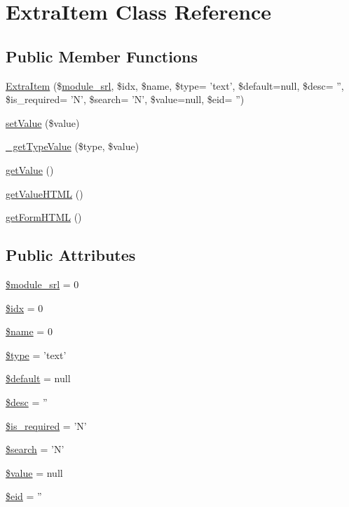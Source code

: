 \hypertarget{classExtraItem}{\section{Extra\-Item Class Reference}
\label{classExtraItem}
}
\subsection*{Public Member Functions}
\begin{DoxyCompactItemize}
\item 
\hyperlink{classExtraItem_abdf34ec801688507ddbc1acd513d2f8d}{Extra\-Item} (\$\hyperlink{ko_8install_8php_a370bb6450fab1da3e0ed9f484a38b761}{module\-\_\-srl}, \$idx, \$name, \$type= 'text', \$default=null, \$desc= '', \$is\-\_\-required= 'N', \$search= 'N', \$value=null, \$eid= '')
\item 
\hyperlink{classExtraItem_a6bec289dc0622bd882a36cb9b5680b03}{set\-Value} (\$value)
\item 
\hyperlink{classExtraItem_ac285a098cdd05b2c152b3d94c8cb95db}{\-\_\-get\-Type\-Value} (\$type, \$value)
\item 
\hyperlink{classExtraItem_a61ff542aa57144ac9e8d20d40f426486}{get\-Value} ()
\item 
\hyperlink{classExtraItem_a7784f081919e81e4a41ab0c250d6ca52}{get\-Value\-H\-T\-M\-L} ()
\item 
\hyperlink{classExtraItem_aaedac8843abdf391e8f4d22704606898}{get\-Form\-H\-T\-M\-L} ()
\end{DoxyCompactItemize}
\subsection*{Public Attributes}
\begin{DoxyCompactItemize}
\item 
\hyperlink{classExtraItem_a21cce86c0846b13228273314216e5ab9}{\$module\-\_\-srl} = 0
\item 
\hyperlink{classExtraItem_aadcda4aa903481b261d86bc50ab1c238}{\$idx} = 0
\item 
\hyperlink{classExtraItem_a32694a2408e9e2cca1d680356cf937d3}{\$name} = 0
\item 
\hyperlink{classExtraItem_ac965cc202d067c0449be9976045fd4be}{\$type} = 'text'
\item 
\hyperlink{classExtraItem_a8499b54a8ec7aa3e3a40201d1458ffe5}{\$default} = null
\item 
\hyperlink{classExtraItem_a47059cf3ac48f0d31c5358fa5e97f106}{\$desc} = ''
\item 
\hyperlink{classExtraItem_a616da9975ea87e9b61b6b9a2daf5e769}{\$is\-\_\-required} = 'N'
\item 
\hyperlink{classExtraItem_a086e30bc8e2d078ad1108d00ae58a60c}{\$search} = 'N'
\item 
\hyperlink{classExtraItem_a46622b49026acdfce833d5118a43986d}{\$value} = null
\item 
\hyperlink{classExtraItem_a8a68f26bb602679ebf4095e774425092}{\$eid} = ''
\end{DoxyCompactItemize}


